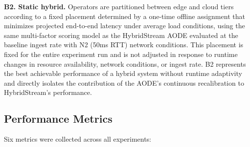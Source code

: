 \documentclass[preprint,review,12pt]{elsarticle}
\begin{document}
\textbf{B2. Static hybrid.} Operators are partitioned between edge and cloud tiers according to a fixed placement determined by a one-time offline assignment that minimizes projected end-to-end latency under average load conditions, using the same multi-factor scoring model as the HybridStream AODE evaluated at the baseline ingest rate with N2 (50ms RTT) network conditions. This placement is fixed for the entire experiment run and is not adjusted in response to runtime changes in resource availability, network conditions, or ingest rate. B2 represents the best achievable performance of a hybrid system without runtime adaptivity and directly isolates the contribution of the AODE's continuous recalibration to HybridStream's performance.

\subsection{Performance Metrics}\label{performance-metrics}

Six metrics were collected across all experiments:
\end{document}
